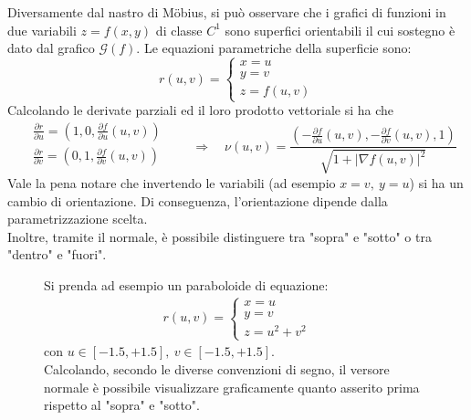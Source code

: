  \begin{example}
     Diversamente dal nastro di Möbius, si può osservare che i grafici di funzioni in due variabili $z=f(x,y)$ di classe $C^1$ sono superfici orientabili il cui sostegno è dato dal grafico $\mathcal{G}(f)$.
     Le equazioni parametriche della superficie sono:
     \begin{equation*}
         r(u,v)=\begin{cases}
             x= u\\
             y=v\\
             z=f(u,v)
         \end{cases}
     \end{equation*}
     Calcolando le derivate parziali ed il loro prodotto vettoriale si ha che
     \begin{equation*}
        \begin{aligned}
            &\frac{\partial r}{\partial u} = \left( 1, 0, \frac{\partial f}{\partial u}(u,v)\right)\\
            &\frac{\partial r}{\partial v} = \left( 0, 1, \frac{\partial f}{\partial v}(u,v)\right)\\
        \end{aligned}
            \qquad \Rightarrow \quad \nu(u,v)= \frac{\left(-\frac{\partial f}{\partial u}(u,v), -\frac{\partial f}{\partial v}(u,v), 1\right)}{\sqrt{1+ \left| \nabla f(u,v) \right|^2}}
     \end{equation*}
     Vale la pena notare che invertendo le variabili (ad esempio $x=v,\ y=u$) si ha un cambio di orientazione. Di conseguenza, l'orientazione dipende dalla parametrizzazione scelta.\\
     Inoltre, tramite il normale, è possibile distinguere tra "sopra" e  "sotto" o tra "dentro" e "fuori".
     \begin{figure}[H]
         \centering
         \begin{minipage}{0.4\textwidth}
         Si prenda ad esempio un paraboloide di equazione:
         \begin{align*}
             r(u,v)= \begin{cases}
                 x=u\\
                 y=v\\
                 z=u^2+v^2
             \end{cases}
         \end{align*}
        con $u \in [-1.5, +1.5],\ v \in [-1.5, +1.5]$.\\
        Calcolando, secondo le diverse convenzioni di segno, il versore normale è possibile visualizzare graficamente quanto asserito prima rispetto al "sopra" e "sotto".

\end{minipage}
\end{figure}
\end{example}
